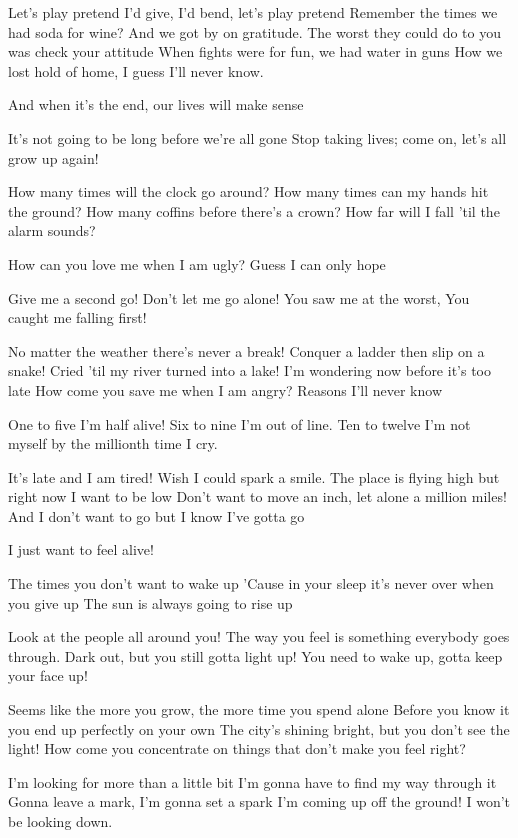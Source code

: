 Let's play pretend
I'd give, I'd bend, let's play pretend
Remember the times we had soda for wine?
And we got by on gratitude.
The worst they could do to you was check your attitude
When fights were for fun, we had water in guns
How we lost hold of home, I guess I'll never know.

And when it's the end, our lives will make sense

It's not going to be long before we're all gone
Stop taking lives; come on, let's all grow up again!


How many times will the clock go around?
How many times can my hands hit the ground?
How many coffins before there's a crown?
How far will I fall 'til the alarm sounds?

How can you love me when I am ugly?
Guess I can only hope

Give me a second go!
Don't let me go alone!
You saw me at the worst, You caught me falling first!

No matter the weather there's never a break!
Conquer a ladder then slip on a snake!
Cried 'til my river turned into a lake!
I'm wondering now before it's too late
How come you save me when I am angry?
Reasons I'll never know

One to five I'm half alive!
Six to nine I'm out of line.
Ten to twelve I'm not myself by the millionth time I cry.


It's late and I am tired!
Wish I could spark a smile.
The place is flying high but right now I want to be low
Don't want to move an inch, let alone a million miles!
And I don't want to go but I know I've gotta go

I just want to feel alive!

The times you don't want to wake up
'Cause in your sleep it's never over when you give up
The sun is always going to rise up

Look at the people all around you!
The way you feel is something everybody goes through.
Dark out, but you still gotta light up!
You need to wake up, gotta keep your face up!

Seems like the more you grow, the more time you spend alone
Before you know it you end up perfectly on your own
The city's shining bright, but you don't see the light!
How come you concentrate on things that don't make you feel right?

I'm looking for more than a little bit
I'm gonna have to find my way through it
Gonna leave a mark, I'm gonna set a spark
I'm coming up off the ground!
I won't be looking down.


